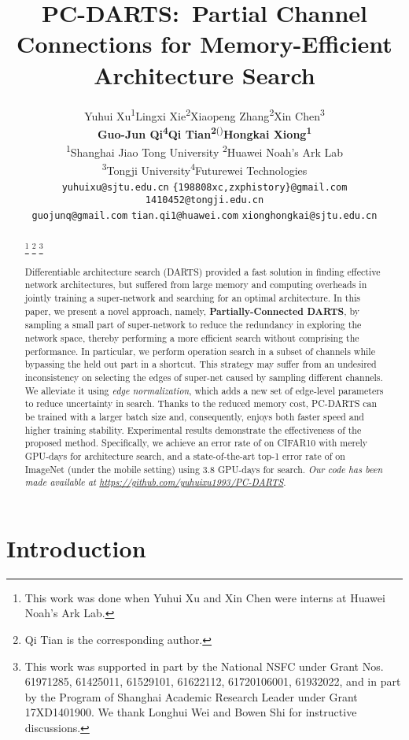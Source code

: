 \documentclass{article} \usepackage{iclr2020_conference,times}
\title{PC-DARTS:\ Partial Channel Connections for Memory-Efficient Architecture Search}
\author{Yuhui Xu\textsuperscript{1}\quad Lingxi Xie\textsuperscript{2}\quad Xiaopeng Zhang\textsuperscript{2}\quad Xin Chen\textsuperscript{3}\\
  \textbf{Guo-Jun Qi}\textsuperscript{\textbf{4}}\quad \textbf{Qi Tian}\textsuperscript{\textbf{2}(\Letter)}\quad \textbf{Hongkai Xiong}\textsuperscript{\textbf{1}} \\
  \textsuperscript{1}Shanghai Jiao Tong University \quad \textsuperscript{2}Huawei Noah's Ark Lab\\
  \textsuperscript{3}Tongji University\quad \textsuperscript{4}Futurewei Technologies \\
  \small\texttt{yuhuixu@sjtu.edu.cn}\quad
  \small\texttt{\{198808xc,zxphistory\}@gmail.com}\quad
  \small\texttt{1410452@tongji.edu.cn}\\
  \small\texttt{guojunq@gmail.com}\quad
  \small\texttt{tian.qi1@huawei.com}\quad
  \small\texttt{xionghongkai@sjtu.edu.cn}
}
\begin{document}
\maketitle

\begin{abstract}
\let\thefootnote\relax\footnote{\textsuperscript{} This work was done when Yuhui Xu and Xin Chen were interns at Huawei Noah's Ark Lab.}
\footnote{\textsuperscript{\Letter} Qi Tian is the corresponding author.}
\let\thefootnote\relax\footnote{This work was supported in part by the National NSFC under Grant Nos. 61971285, 61425011, 61529101, 61622112, 61720106001, 61932022, and in part by the Program of Shanghai Academic Research Leader under Grant 17XD1401900. We thank Longhui Wei and Bowen Shi for instructive discussions.}

Differentiable architecture search (DARTS) provided a fast solution in finding effective network architectures, but suffered from large memory and computing overheads in jointly training a super-network and searching for an optimal architecture. In this paper, we present a novel approach, namely, \textbf{Partially-Connected DARTS}, by sampling a small part of super-network to reduce the redundancy in exploring the network space, thereby performing a more efficient search without comprising the performance. In particular, we perform operation search in a subset of channels while bypassing the held out part in a shortcut. This strategy may suffer from an undesired inconsistency on selecting the edges of super-net caused by sampling different channels. We alleviate it using \textit{edge normalization}, which adds a new set of edge-level parameters to reduce uncertainty in search. Thanks to the reduced memory cost, PC-DARTS can be trained with a larger batch size and, consequently, enjoys both faster speed and higher training stability. Experimental results demonstrate the effectiveness of the proposed method. Specifically, we achieve an error rate of  on CIFAR10 with merely  GPU-days for architecture search, and a state-of-the-art top-1 error rate of  on ImageNet (under the mobile setting) using 3.8 GPU-days for search. \textit{Our code has been made available at \url{https://github.com/yuhuixu1993/PC-DARTS}}.
\end{abstract}

\section{Introduction}
\label{Introduction}
\end{document}
